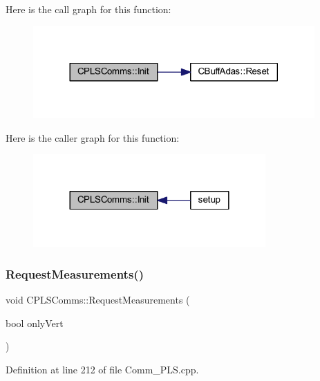 Here is the call graph for this function\+:\nopagebreak
\begin{figure}[H]
\begin{center}
\leavevmode
\includegraphics[width=305pt]{class_c_p_l_s_comms_ae7f8d87ea15de35a120d65a7a8bbbb76_cgraph}
\end{center}
\end{figure}
Here is the caller graph for this function\+:\nopagebreak
\begin{figure}[H]
\begin{center}
\leavevmode
\includegraphics[width=252pt]{class_c_p_l_s_comms_ae7f8d87ea15de35a120d65a7a8bbbb76_icgraph}
\end{center}
\end{figure}
\mbox{\label{class_c_p_l_s_comms_ae8f7e9acdf4243b76f3c7f61cf766cfc}} 
\subsubsection{\texorpdfstring{Request\+Measurements()}{RequestMeasurements()}}
{\footnotesize\ttfamily void C\+P\+L\+S\+Comms\+::\+Request\+Measurements (\begin{DoxyParamCaption}\item[{bool}]{only\+Vert }\end{DoxyParamCaption})}



Definition at line 212 of file Comm\+\_\+\+P\+L\+S.\+cpp.

